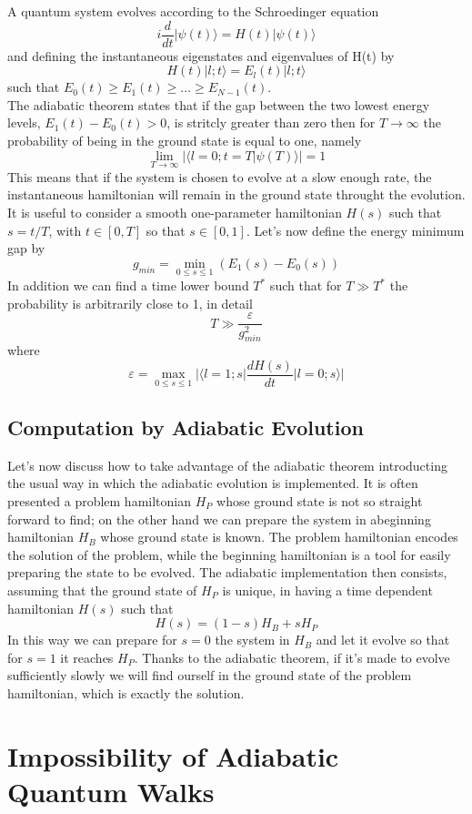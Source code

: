 A quantum system evolves according to the Schroedinger equation
\begin{equation}
    i\frac{d}{dt}|\psi(t)\rangle = H(t)|\psi(t)\rangle
\end{equation}
and defining the instantaneous eigenstates and eigenvalues of H(t) by
\begin{equation}
    H(t)|l;t\rangle = E_l(t)|l;t\rangle
\end{equation}
such that $E_0(t) \geq E_1(t) \geq ... \geq E_{N-1}(t)$. \\
The adiabatic theorem states that if the gap between the two lowest energy levels, $E_{1}(t) - E_{0}(t) > 0$, is stritcly greater than zero then for $T\rightarrow \infty$ the probability of being in the ground state is equal to one, namely
\begin{equation}
    \lim_{T \to \infty} |\langle l=0;t = T | \psi(T)\rangle| = 1
\end{equation}
This means that if the system is chosen to evolve at a slow enough rate, the instantaneous hamiltonian will remain in the ground state throught the evolution. It is useful to consider a smooth one-parameter hamiltonian $H(s)$ such that $s=t/T$, with $t \in [0,T]$ so that $s \in [0,1]$.
Let's now define the energy minimum gap by
\begin{equation}
    g_{min} = \min_{0 \leq s \leq 1} (E_1(s)-E_0(s))
\end{equation}
In addition we can find a time lower bound $T^*$ such that for $T\gg T^{*}$ the probability is arbitrarily close to 1, in detail
\begin{equation}
    T \gg \frac{\varepsilon}{g^{2}_{min}}
\end{equation}
where
\begin{equation}
    \varepsilon = \max_{0 \leq s \leq 1} \Big| \Big\langle l=1;s\Big| \frac{dH(s)}{dt} \Big| l=0;s\Big\rangle\Big|
\end{equation}

\subsection{Computation by Adiabatic Evolution}
Let's now discuss how to take advantage of the adiabatic theorem introducting the usual way in which the adiabatic evolution is implemented. It is often presented a problem hamiltonian $H_P$ whose ground state is not so straight forward to find; on the other hand we can prepare the system in abeginning hamiltonian $H_B$ whose ground state is known. The problem hamiltonian encodes the solution of the problem, while the beginning hamiltonian is a tool for easily preparing the state to be evolved. The adiabatic implementation then consists, assuming that the ground state of $H_P$ is unique, in having a time dependent hamiltonian $H(s)$ such that
\begin{equation}
    H(s) = (1-s)H_B + s H_P
\end{equation}
In this way we can prepare for $s=0$ the system in $H_B$ and let it evolve so that for $s=1$ it reaches $H_P$. Thanks to the adiabatic theorem, if it's made to evolve sufficiently slowly we will find ourself in the ground state of the problem hamiltonian, which is exactly the solution.

\section{Impossibility of Adiabatic Quantum Walks}
\cite{Wong2016}
